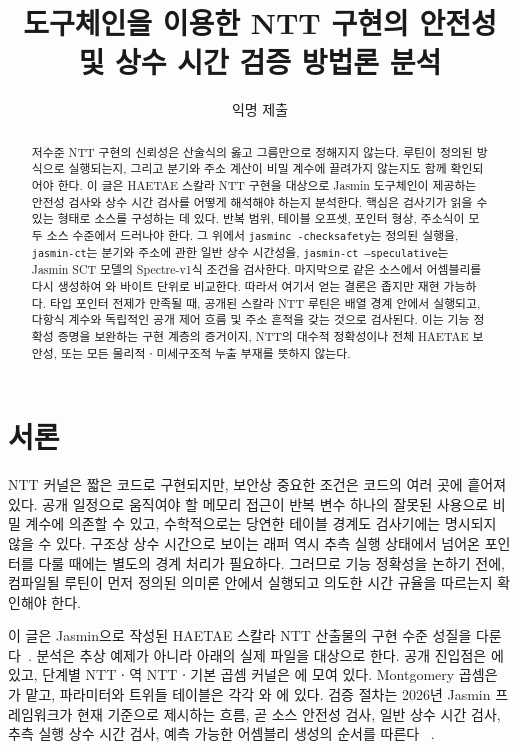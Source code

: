 \documentclass[10pt,twocolumn]{article}
\title{\vspace{-0.8em}\jasmin{} 도구체인을 이용한 NTT 구현의 안전성 및 상수 시간 검증 방법론 분석}
\author{익명 제출}
\date{}
\newcommand{\haetae}{HAETAE}
\newcommand{\jasmin}{Jasmin}
\begin{document}
\maketitle
\vspace{-1.1em}

\begin{abstract}
저수준 NTT 구현의 신뢰성은 산술식의 옳고 그름만으로 정해지지 않는다.
루틴이 정의된 방식으로 실행되는지, 그리고 분기와 주소 계산이 비밀
계수에 끌려가지 않는지도 함께 확인되어야 한다. 이 글은 \haetae{} 스칼라
NTT 구현을 대상으로 \jasmin{} 도구체인이 제공하는 안전성 검사와 상수
시간 검사를 어떻게 해석해야 하는지 분석한다. 핵심은 검사기가 읽을 수
있는 형태로 소스를 구성하는 데 있다. 반복 범위, 테이블 오프셋, 포인터
형상, 주소식이 모두 소스 수준에서 드러나야 한다. 그 위에서
\texttt{jasminc -checksafety}는 정의된 실행을, \texttt{jasmin-ct}는
분기와 주소에 관한 일반 상수 시간성을, \texttt{jasmin-ct --speculative}는
\jasmin{} SCT 모델의 Spectre-v1식 조건을 검사한다. 마지막으로 같은
소스에서 어셈블리를 다시 생성하여 와 바이트 단위로
비교한다. 따라서 여기서 얻는 결론은 좁지만 재현 가능하다. 타입 포인터
전제가 만족될 때, 공개된 스칼라 NTT 루틴은 배열 경계 안에서 실행되고,
다항식 계수와 독립적인 공개 제어 흐름 및 주소 흔적을 갖는 것으로
검사된다. 이는 기능 정확성 증명을 보완하는 구현 계층의 증거이지, NTT의
대수적 정확성이나 전체 \haetae{} 보안성, 또는 모든 물리적ㆍ미세구조적
누출 부재를 뜻하지 않는다.
\end{abstract}

\section{서론}

NTT 커널은 짧은 코드로 구현되지만, 보안상 중요한 조건은 코드의 여러
곳에 흩어져 있다. 공개 일정으로 움직여야 할 메모리 접근이 반복 변수
하나의 잘못된 사용으로 비밀 계수에 의존할 수 있고, 수학적으로는 당연한
테이블 경계도 검사기에는 명시되지 않을 수 있다. 구조상 상수 시간으로
보이는 래퍼 역시 추측 실행 상태에서 넘어온 포인터를 다룰 때에는 별도의
경계 처리가 필요하다. 그러므로 기능 정확성을 논하기 전에, 컴파일될
루틴이 먼저 정의된 의미론 안에서 실행되고 의도한 시간 규율을 따르는지
확인해야 한다.

이 글은 \jasmin{}으로 작성된 \haetae{} 스칼라 NTT 산출물의 구현 수준
성질을 다룬다~\cite{Jasmin2017}. 분석은 추상 예제가 아니라
 아래의 실제 파일을 대상으로 한다. 공개 진입점은
에 있고, 단계별 NTTㆍ역 NTTㆍ기본 곱셈 커널은
에 모여 있다. Montgomery 곱셈은 가
맡고, 파라미터와 트위들 테이블은 각각 와
에 있다. 검증 절차는 2026년 \jasmin{} 프레임워크가
현재 기준으로 제시하는 흐름, 곧 소스 안전성 검사, 일반 상수 시간 검사,
추측 실행 상수 시간 검사, 예측 가능한 어셈블리 생성의 순서를 따른다
~\cite{Jasmin2017,LastMile2020,JasminFramework2026}.
\end{document}
